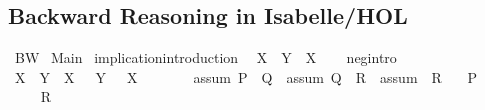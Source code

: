 %
\begin{isabellebody}%
%
%
\begin{isamarkuptext}%
\section*{Backward Reasoning in Isabelle/HOL}%
\end{isamarkuptext}\isamarkuptrue%
%
\isadelimtheory
%
\endisadelimtheory
%
\isatagtheory
{}\isamarkupfalse%
\ BW\isanewline
{}\ Main\isanewline
{}%
\endisatagtheory
{\isafoldtheory}%
%
\isadelimtheory
%
\endisadelimtheory
\isanewline
\isanewline
{}\isamarkupfalse%
\ implication{\isacharunderscore}{\kern0pt}introduction{\isacharcolon}{\kern0pt}\isanewline
\ \ {\isachardoublequoteopen}X\ {\isasymLongrightarrow}\ {\isacharparenleft}{\kern0pt}Y\ {\isasymlongrightarrow}\ X{\isacharparenright}{\kern0pt}{\isachardoublequoteclose}\isanewline
%
\isadelimproof
\ \ %
\endisadelimproof
%
\isatagproof
{}\isamarkupfalse%
%
\endisatagproof
{\isafoldproof}%
%
\isadelimproof
\isanewline
%
\endisadelimproof
\isanewline
{}\isamarkupfalse%
\ neg{\isacharunderscore}{\kern0pt}intro{\isacharcolon}{\kern0pt}\isanewline
\ {\isachardoublequoteopen}{\isacharparenleft}{\kern0pt}X\ {\isasymlongrightarrow}\ Y{\isacharparenright}{\kern0pt}\ {\isasymLongrightarrow}\ {\isacharparenleft}{\kern0pt}X\ {\isasymlongrightarrow}\ {\isasymnot}\ Y{\isacharparenright}{\kern0pt}\ {\isasymLongrightarrow}\ {\isasymnot}\ X{\isachardoublequoteclose}\isanewline
%
\isadelimproof
\ \ %
\endisadelimproof
%
\isatagproof
{}\isamarkupfalse%
%
\endisatagproof
{\isafoldproof}%
%
\isadelimproof
\isanewline
%
\endisadelimproof
\isanewline
{}\isamarkupfalse%
\ \isanewline
\ \ \ assum{}{\isacharcolon}{\kern0pt}\ {\isachardoublequoteopen}P\ {\isasymlongrightarrow}\ Q{\isachardoublequoteclose}\ \ assum{}{\isacharcolon}{\kern0pt}\ {\isachardoublequoteopen}Q\ {\isasymlongrightarrow}\ R{\isachardoublequoteclose}\ \ assum{}{\isacharcolon}{\kern0pt}\ {\isachardoublequoteopen}{\isasymnot}\ R{\isachardoublequoteclose}\isanewline
\ \ \ {\isachardoublequoteopen}{\isasymnot}P{\isachardoublequoteclose}\isanewline
%
\isadelimproof
%
\endisadelimproof
%
\isatagproof
{}\isamarkupfalse%
{\isacharminus}{\kern0pt}\isanewline
\ \ \isanewline
\ \ \isamarkupfalse%
\ {}{\isacharcolon}{\kern0pt}\ {\isachardoublequoteopen}{\isasymnot}R{\isachardoublequoteclose}\isanewline

\end{isabellebody}

